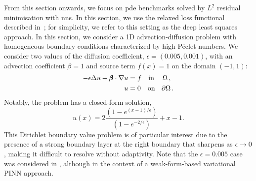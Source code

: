 \documentclass[oneside,reqno,11pt,a4paper]{amsart}
\theoremstyle{definition}
\begin{document}
From this section onwards, we focus on \ac{pde} benchmarks solved by
$L^2$ residual minimisation with \acp{nn}. In this section, we use the relaxed loss
functional described in~; for simplicity, we
refer to this setting as the deep least squares approach.
In this section, we consider a 1D advection-diffusion problem with homogeneous
boundary conditions characterized by high P{\'e}clet numbers. We consider two
values of the diffusion coefficient, $\epsilon = (0.005, 0.001)$, with an
advection coefficient $\beta = 1$ and source term $f(x) = 1$ on the
domain $(-1,1)$:
\begin{align} \label{eq:1d-adv-diff}
- \epsilon \Delta u + \pmb{\beta}\cdot \nabla u &= f \quad \text{in \;\; } \Omega\,,\\
u &= 0 \quad \text{on \; } \partial\Omega \,.
\end{align}
Notably, the problem has a closed-form solution,
\begin{equation}
u(x) = 2\frac{\left(1 - e^{(x - 1)/\epsilon}\right)}{\left(1 - e^{-2/\epsilon}\right)} + x - 1.
\end{equation}
This Dirichlet boundary value problem is of particular interest due to the
presence of a strong boundary layer at the right boundary that sharpens
as $\epsilon \to 0$, making it difficult to resolve without adaptivity.
Note that the $\epsilon = 0.005$ case was considered in
\cite{RobustVPINNs2024}, although in the context of a weak-form-based
variational PINN approach. 
\end{document}
